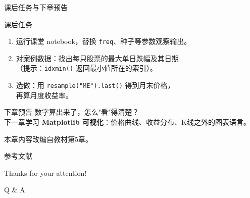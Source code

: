 \documentclass[9pt]{ctexbeamer}
\begin{document}
\begin{frame}{课后任务与下章预告}
	\begin{block}{课后任务}
		\begin{enumerate}
			\item 运行课堂 notebook，替换 \texttt{freq}、种子等参数观察输出。
			\item 对案例数据：找出每只股票的最大单日跌幅及其日期\\
			（提示：\texttt{idxmin()} 返回最小值所在的索引）。
			\item 选做：用 \texttt{resample("ME").last()} 得到月末价格，\\
			再算月度收益率。
		\end{enumerate}
	\end{block}
	\begin{exampleblock}{下章预告}
		数字算出来了，怎么"看"得清楚？\\
		下一章学习 \textbf{Matplotlib 可视化}：价格曲线、收益分布、K线之外的图表语言。
	\end{exampleblock}
	\begin{center}
		\vspace{0.5em}
		本章内容改编自教材第5章\citep{hilpisch2018python}。
	\end{center}
\end{frame}


\appendix

\begin{frame}[allowframebreaks]{参考文献}
	
	
\end{frame}

\begin{frame}
	\begin{center}
		{\Huge\calligra Thanks for your attention!}
		\vspace{1cm}

		{\Huge Q \& A}
	\end{center}
\end{frame}
\end{document}
